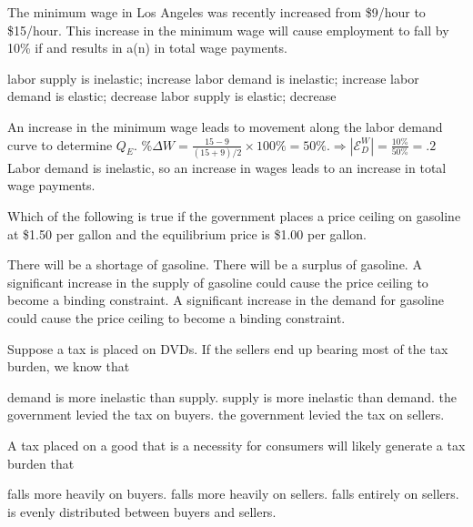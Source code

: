\documentclass[addpoints,11pt]{exam}
\theoremstyle{definition}
\newcommand{\blank}[0]{\underline{\hspace{3cm}}}
\begin{document}
\begin{questions}
	\question The minimum wage in Los Angeles was recently increased from \$9/hour to \$15/hour. This increase in the minimum wage will cause employment to fall by 10\% if \blank and results in a(n) \blank in total wage payments.
	
	\begin{choices}
		\choice labor supply is inelastic; increase
		\CorrectChoice labor demand is inelastic; increase
		\choice labor demand is elastic; decrease
		\choice labor supply is elastic; decrease
	\end{choices}
	
	\begin{solution}
		An increase in the minimum wage leads to movement along the labor demand curve to determine $Q_E$. $\%\Delta W = \frac{15 - 9}{(15+9)/2} \times 100\% = 50\%. \Rightarrow |\mathcal{E}_D^W| = \frac{10\%}{50\%} = .2$ Labor demand is inelastic, so an increase in wages leads to an increase in total wage payments.
	\end{solution}
	
\question Which of the following is true if the government places a price ceiling on gasoline at \$1.50 per gallon and the equilibrium price is \$1.00 per gallon.

\begin{choices}
	\choice There will be a shortage of gasoline.
	\choice There will be a surplus of gasoline.
	\choice A significant increase in the supply of gasoline could cause the price ceiling to become a binding constraint.
	\CorrectChoice A significant increase in the demand for gasoline could cause the price ceiling to become a binding constraint.
\end{choices}
	
\question Suppose a tax is placed on DVDs. If the sellers end up bearing most of the tax burden, we know that

\begin{choices}
	\choice demand is more inelastic than supply.
	\CorrectChoice supply is more inelastic than demand.
	\choice the government levied the tax on buyers.
	\choice the government levied the tax on sellers.
\end{choices}

\newpage

\question A tax placed on a good that is a necessity for consumers will likely generate a tax burden that

\begin{choices}
	\CorrectChoice falls more heavily on buyers.
	\choice falls more heavily on sellers.
	\choice falls entirely on sellers.
	\choice is evenly distributed between buyers and sellers.
\end{choices}


\end{questions}
\end{document}
